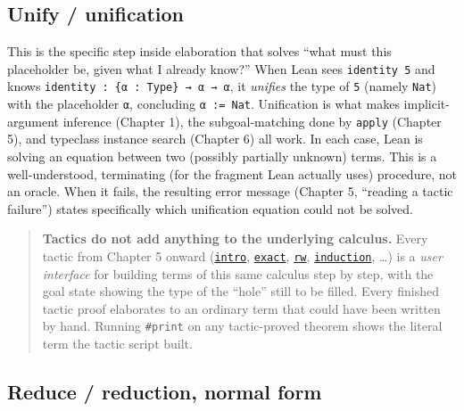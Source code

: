 \subsection{Unify / unification}\label{sec:02-terminology-and-coc:01-terminology:3}

This is the specific step inside elaboration that solves ``what must this placeholder be, given what I already know?'' When Lean sees \texttt{identity 5} and knows \texttt{identity : \{α : Type\} → α → α}, it \emph{unifies} the type of \texttt{5} (namely \texttt{Nat}) with the placeholder \texttt{α}, concluding \texttt{α := Nat}. Unification is what makes implicit-argument inference (Chapter 1), the subgoal-matching done by \texttt{apply} (Chapter 5), and typeclass instance search (Chapter 6) all work. In each case, Lean is solving an equation between two (possibly partially unknown) terms. This is a well-understood, terminating (for the fragment Lean actually uses) procedure, not an oracle. When it fails, the resulting error message (Chapter 5, ``reading a tactic failure'') states specifically which unification equation could not be solved.

\begin{quote}
\textbf{Tactics do not add anything to the underlying calculus.} Every tactic from Chapter 5 onward (\href{https://lean-lang.org/doc/reference/latest/Tactic-Proofs/Tactic-Reference/}{\texttt{intro}}, \href{https://lean-lang.org/doc/reference/latest/Tactic-Proofs/Tactic-Reference/}{\texttt{exact}}, \href{https://lean-lang.org/doc/reference/latest/Tactic-Proofs/Tactic-Reference/}{\texttt{rw}}, \href{https://lean-lang.org/doc/reference/latest/Tactic-Proofs/Tactic-Reference/}{\texttt{induction}}, \ldots) is a \emph{user interface} for building terms of this same calculus step by step, with the goal state showing the type of the ``hole'' still to be filled. Every finished tactic proof elaborates to an ordinary term that could have been written by hand. Running \texttt{\#print} on any tactic-proved theorem shows the literal term the tactic script built.
\end{quote}

\subsection{Reduce / reduction, normal form}\label{sec:02-terminology-and-coc:01-terminology:4}

